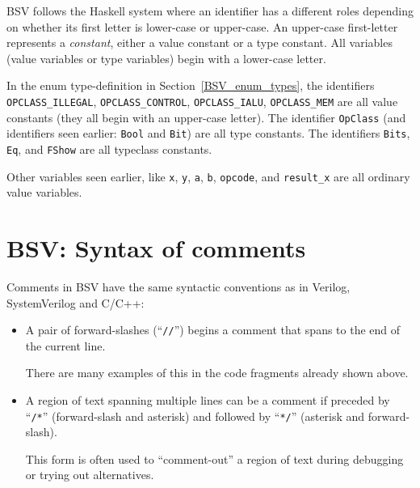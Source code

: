 
BSV follows the Haskell system where an identifier has a different
roles depending on whether its first letter is lower-case or
upper-case.  An upper-case first-letter represents a \emph{constant},
either a value constant or a type constant.  All variables (value
variables or type variables) begin with a lower-case letter.

In the enum type-definition in Section~\ref{BSV_enum_types}, the
identifiers \verb|OPCLASS_ILLEGAL|, \verb|OPCLASS_CONTROL|,
\verb|OPCLASS_IALU|, \verb|OPCLASS_MEM| are all value constants (they
all begin with an upper-case letter).  The identifier \verb|OpClass|
(and identifiers seen earlier: \verb|Bool| and \verb|Bit|) are all
type constants.  The identifiers \verb|Bits|, \verb|Eq|, and
\verb|FShow| are all typeclass constants.

Other variables seen earlier, like \verb|x|, \verb|y|, \verb|a|,
\verb|b|, \verb|opcode|, and \verb|result_x| are all ordinary value
variables.


\section{BSV: Syntax of comments}

\label{BSV_Syntax_of_comments}


Comments in BSV have the same syntactic conventions as in Verilog,
SystemVerilog and C/C++:

\begin{itemize}

  \item A pair of forward-slashes (``\verb|//|'') begins a comment
    that spans to the end of the current line.

    There are many examples of this in the code fragments already
    shown above.

  \item A region of text spanning multiple lines can be a comment if
    preceded by ``\verb|/*|'' (forward-slash and asterisk) and followed by
    ``\verb|*/|'' (asterisk and forward-slash).

    This form is often used to ``comment-out'' a region of text during
    debugging or trying out alternatives.

\end{itemize}

